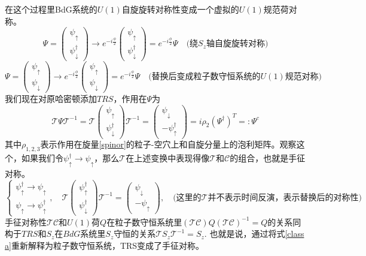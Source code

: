 \documentclass{article}
\numberwithin{equation}{subsection}
\newcommand{\mT}{\mathcal{T}}
\newcommand{\mC}{\mathcal{C}}
\begin{document}
在这个过程里BdG系统的$U(1)$自旋旋转对称性变成一个虚拟的$U(1)$规范荷对称。
\begin{equation}
    \Psi=\begin{pmatrix}
        \psi_\uparrow\\
        \psi_\downarrow^\dagger
    \end{pmatrix}\rightarrow e^{-i\frac{\phi}{2}}\begin{pmatrix}
        \psi_\uparrow\\
        \psi_\downarrow^\dagger
    \end{pmatrix}=e^{-i\frac{\phi}{2}}\Psi\quad\text{(绕$S_z$轴自旋旋转对称)}
\end{equation}
\begin{equation}
    \Psi=\begin{pmatrix}
        \psi_\uparrow\\
        \psi_\downarrow
    \end{pmatrix}\rightarrow e^{-i\frac{\phi}{2}}\begin{pmatrix}
        \psi_\uparrow\\
        \psi_\downarrow
    \end{pmatrix}=e^{-i\frac{\phi}{2}}\Psi\quad\text{(替换后变成粒子数守恒系统的$U(1)$规范对称)}
\end{equation}
我们现在对原哈密顿添加$TRS$，作用在$\Psi$为
\begin{equation}
    \mT\Psi \mT^{-1}=\mT\begin{pmatrix}
        \psi_\uparrow\\
        \psi_\downarrow^\dagger
    \end{pmatrix}\mT^{-1}=\begin{pmatrix}
        \psi_\downarrow\\
        -\psi_\uparrow^\dagger
    \end{pmatrix}=i\rho_2(\Psi^\dagger)^T=:\Psi^c
\end{equation}
其中$\rho_{1,2,3}$表示作用在旋量\eqref{spinor}的粒子-空穴上和自旋分量上的泡利矩阵。观察这个，如果我们令$\psi_\uparrow^\dagger\rightarrow\psi_\uparrow$，那么$\mT$在上述变换中表现得像$\mT$和$\mC$的组合，也就是手征对称。
\begin{equation}
    \begin{cases}
        \psi_\uparrow^\dagger\rightarrow\psi_\uparrow\\
        \psi_\uparrow\rightarrow\psi_\uparrow^\dagger
    \end{cases},\quad \mT \begin{pmatrix}
        \psi_\uparrow^\dagger\\
        \psi_\downarrow^\dagger
    \end{pmatrix}\mT^{-1}=\begin{pmatrix}
        \psi_\downarrow\\
        -\psi_\uparrow
    \end{pmatrix},\quad\text{(这里的$\mT$并不表示时间反演，表示替换后的对称性)}
\end{equation}
手征对称性$\mT\mC$和$U(1)$荷$Q$在粒子数守恒系统里$(\mT\mC)Q(\mT\mC)^{-1}=Q$的关系同构于$TRS$和$S_z$在$BdG$系统里$S_z$守恒的关系$\mT S_z\mT^{-1}=S_z$. 也就是说，通过将式\eqref{class a}重新解释为粒子数守恒系统，TRS变成了手征对称。
\end{document}
